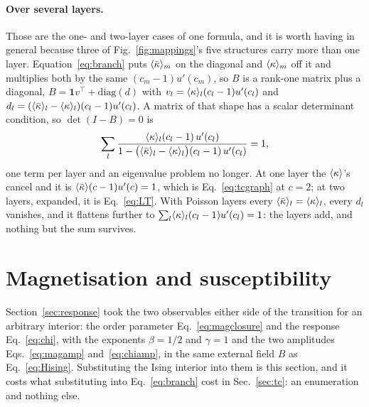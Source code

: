 \paragraph{Over several layers.} Those are the one- and two-layer cases of one
formula, and it is worth having in general because three of
Fig.~\ref{fig:mappings}'s five structures carry more than one layer.
Equation~\eqref{eq:branch} puts $\langle \bar\kappa \rangle_{m}$ on the diagonal and
$\langle \kappa \rangle_{m}$ off it and multiplies both by the same
$(c_{m}-1)u'(c_{m})$, so $B$ is a rank-one matrix plus a diagonal,
$B=\mathbf{1}v^{\!\top}+\mathrm{diag}(d)$ with
$v_{l}=\langle \kappa \rangle_{l}(c_{l}-1)u'(c_{l})$ and
$d_{l}=(\langle \bar\kappa \rangle_{l}-\langle \kappa \rangle_{l})(c_{l}-1)u'(c_{l})$. A matrix of that
shape has a scalar determinant condition, so $\det(I-B)=0$ is
\begin{equation}
  \sum_{l}\frac{\langle \kappa \rangle_{l}(c_{l}-1)\,u'(c_{l})}
               {1-\bigl(\langle \bar\kappa \rangle_{l}-\langle \kappa \rangle_{l}\bigr)(c_{l}-1)\,u'(c_{l})}
  =1,
  \label{eq:tcmulti}
\end{equation}
one term per layer and an eigenvalue problem no longer. At one layer the
$\langle \kappa \rangle$'s cancel and it is $\langle \bar\kappa \rangle(c-1)u'(c)=1$, which is
Eq.~\eqref{eq:tcgraph} at $c=2$; at two layers, expanded, it is
Eq.~\eqref{eq:LT}. With Poisson layers every $\langle \bar\kappa \rangle_{l}=\langle \kappa \rangle_{l}$,
every $d_{l}$ vanishes, and it flattens further to
$\sum_{l}\langle \kappa \rangle_{l}(c_{l}-1)u'(c_{l})=1$: the layers add, and nothing but
the sum survives.

\section{Magnetisation and susceptibility}
\label{sec:magnetisation}

Section~\ref{sec:response} took the two observables either side of the
transition for an arbitrary interior: the order parameter
Eq.~\eqref{eq:magclosure} and the response Eq.~\eqref{eq:chi}, with the
exponents $\beta=1/2$ and $\gamma=1$ and the two amplitudes
Eqs.~\eqref{eq:magamp} and~\eqref{eq:chiamp}, in the same external field $B$
as Eq.~\eqref{eq:Hising}. Substituting the Ising interior into them is this
section, and it costs what substituting into Eq.~\eqref{eq:branch} cost in
Sec.~\ref{sec:tc}: an enumeration and nothing else.

